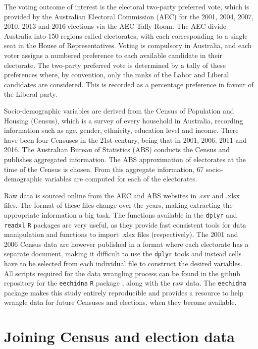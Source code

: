 \documentclass[openany]{book}
\begin{document}
The voting outcome of interest is the electoral two-party preferred vote, which is provided by the Australian Electoral Commission (AEC) for the 2001, 2004, 2007, 2010, 2013 and 2016 elections via the AEC Tally Room. The AEC divide Australia into 150 regions called electorates, with each corresponding to a single seat in the House of Representatives. Voting is compulsory in Australia, and each voter assigns a numbered preference to each available candidate in their electorate. The two-party preferred vote is determined by a tally of these preferences where, by convention, only the ranks of the Labor and Liberal candidates are considered. This is recorded as a percentage preference in favour of the Liberal party.

Socio-demographic variables are derived from the Census of Population and Housing (Census), which is a survey of every household in Australia, recording information such as age, gender, ethnicity, education level and income. There have been four Censuses in the 21st century, being that in 2001, 2006, 2011 and 2016. The Australian Bureau of Statistics (ABS) conducts the Census and publishes aggregated information. The ABS approximation of electorates at the time of the Census is chosen. From this aggregate information, 67 socio-demographic variables are computed for each of the electorates.

Raw data is sourced online from the AEC and ABS websites in .csv and .xlsx files. The format of these files change over the years, making extracting the appropriate information a big task. The functions available in the \texttt{dplyr} \citep{dplyr} and \texttt{readxl} \citep{readxl} \texttt{R} packages are very useful, as they provide fast consistent tools for data manipulation and functions to import .xlsx files (respectively). The 2001 and 2006 Census data are however published in a format where each electorate has a separate document, making it difficult to use the \texttt{dplyr} tools and instead cells have to be selected from each individual file to construct the desired variables. All scripts required for the data wrangling process can be found in the github repository for the \texttt{eechidna} \texttt{R} package \citep{eechidna}, along with the raw data. The \texttt{eechidna} package makes this study entirely reproducible and provides a resource to help wrangle data for future Censuses and elections, when they become available.

\hypertarget{joining-census-and-election-data}{%
\section{Joining Census and election data}\label{joining-census-and-election-data}}
\end{document}
